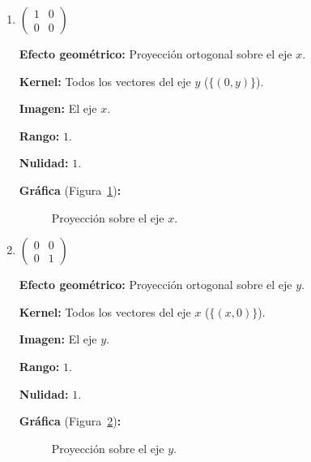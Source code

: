 \begin{prob}
\begin{enumerate}[$a)$]
    \item $\begin{pmatrix} 1 & 0 \\ 0 & 0 \end{pmatrix}$
    \begin{myproof}
    \textbf{Efecto geométrico:} Proyección ortogonal sobre el eje $x$.

    \textbf{Kernel:} Todos los vectores del eje $y$ ($\{(0,y)\}$).

    \textbf{Imagen:} El eje $x$.

    \textbf{Rango:} $1$.

    \textbf{Nulidad:} $1$.

    \textbf{Gráfica} (Figura~\ref{fig:trans_proyeccion_x})\textbf{:}
    \begin{figure}[H]\centering
    \caption{Proyección sobre el eje $x$.}\label{fig:trans_proyeccion_x}
    \end{figure}
    \end{myproof}
    
    \item $\begin{pmatrix} 0 & 0 \\ 0 & 1 \end{pmatrix}$
    \begin{myproof}
    \textbf{Efecto geométrico:} Proyección ortogonal sobre el eje $y$.

    \textbf{Kernel:} Todos los vectores del eje $x$ ($\{(x,0)\}$).

    \textbf{Imagen:} El eje $y$.

    \textbf{Rango:} $1$.

    \textbf{Nulidad:} $1$.

    \textbf{Gráfica} (Figura~\ref{fig:trans_proyeccion_y})\textbf{:}
    \begin{figure}[H]\centering
    \caption{Proyección sobre el eje $y$.}\label{fig:trans_proyeccion_y}
    \end{figure}
    \end{myproof}
    

\end{enumerate}
\end{prob}
